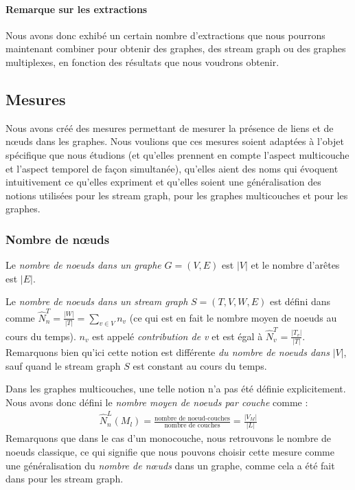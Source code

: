 \documentclass[11pt,a4paper]{article}
\theoremstyle{definition}
\theoremstyle{remark}
\theoremstyle{remark}
\def \stg {stream graph}
\begin{document}
\paragraph{Remarque sur les extractions}
Nous avons donc exhibé un certain nombre d'extractions que nous pourrons maintenant combiner pour obtenir des graphes, des \stg{} ou des graphes multiplexes, en fonction des résultats que nous voudrons obtenir.

\subsection{Mesures}


Nous avons créé des mesures permettant de mesurer la présence de liens et de nœuds dans les graphes. Nous voulions que ces mesures soient adaptées à l'objet spécifique que nous étudions (et qu'elles prennent en compte l'aspect multicouche et l'aspect temporel de façon simultanée), qu'elles aient des noms qui évoquent intuitivement ce qu'elles expriment et qu'elles soient une généralisation des notions utilisées pour les \stg{}, pour les graphes multicouches et pour les graphes.

	\subsubsection{Nombre de nœuds}
	Le {\em nombre de noeuds dans un graphe} $G=(V,E)$ est $|V|$ et le nombre d'arêtes est $|E|$.
	
	Le {\em nombre de noeuds dans un \stg{}} $S=(T,V,W,E)$ est défini dans \cite{stream} comme $\hat{N}^T_n=\frac{|W|}{|T|}=\sum_{v\in V} n_v$ (ce qui est en fait le nombre moyen de noeuds au cours du temps). $n_v$ est appelé {\em contribution de v} et est égal à $\hat{N}^T_v=\frac{|T_v|}{|T|}$. Remarquons bien qu'ici cette notion est différente {\em du nombre de noeuds dans} $|V|$, sauf quand le \stg{} $S$ est constant au cours du temps.
	\newline
	
	Dans les graphes multicouches, une telle notion n'a pas été définie explicitement.
	Nous avons donc défini le {\em nombre moyen de noeuds par couche} comme :
	\begin{align*}
		\hat{N}_n^L(M_l) = \frac{\text{nombre de noeud-couches}}{\text{nombre de couches}}=\frac{|V_M|}{|L|}
	\end{align*}	    
	Remarquons que dans le cas d'un monocouche, nous retrouvons le nombre de noeuds classique, ce qui signifie que nous pouvons choisir cette mesure comme une généralisation du {\em nombre de nœuds} dans un graphe, comme cela a été fait dans \cite{stream} pour les \stg{}.
		
\end{document}
